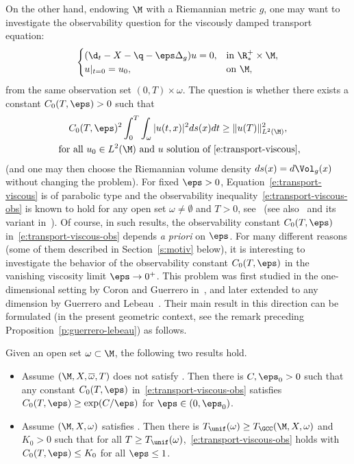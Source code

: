 On the other hand, endowing $\M$ with a Riemannian metric $g$, one may want to investigate the observability question for the viscously damped transport equation:
\begin{equation}
\label{e:transport-viscous}
\begin{cases}
(\d_t - X -\q - \eps \Delta_g ) u = 0, & \text{in } \R^+_*\times \M, \\
u|_{t=0} = u_0, & \text{on } \M,
\end{cases}
\end{equation}
from the same observation set $(0,T)\times\omega$. The question is whether there exists a constant $C_0(T,\eps)>0$ such that
\begin{multline}
\label{e:transport-viscous-obs}
C_0(T,\eps)^2 \int_0^T\int_\omega |u(t,x)|^2 ds(x)dt \geq \|u (T)\|_{L^2(\M)}^2, \\
\text{ for all } u_0 \in L^2(\M) \text{ and } u \text{ solution of~\eqref{e:transport-viscous}},
\end{multline}
(and one may then choose the Riemannian volume density $ds(x) = d\Vol_g(x)$ without changing the problem).
For fixed $\eps>0$, Equation~\eqref{e:transport-viscous} is of parabolic type and the observability inequality~\eqref{e:transport-viscous-obs} is known to hold for any open set $\omega \neq \emptyset$ and $T>0$, see~\cite{FI:96} (see also~\cite{LR:95} and its variant in~\cite{Lea:10}).
Of course, in such results, the observability constant $C_0(T,\eps)$ in~\eqref{e:transport-viscous-obs} depends {\em a priori} on $\eps$.
For many different reasons (some of them described in Section~\ref{s:motiv} below), it is interesting to investigate the behavior of the observability constant $C_0(T,\eps)$ in the vanishing viscosity limit $\eps \to 0^+$. This problem was first studied in the one-dimensional setting by Coron and Guerrero in~\cite{CG:05}, and later extended to any dimension by Guerrero and Lebeau~\cite{GL:07}. Their main result in this direction can be formulated (in the present geometric context, see the remark preceding Proposition~\ref{p:guerrero-lebeau}) as follows.
\begin{theorem}
\label{t:Leb-Guer}
Given an open set $\omega \subset \M$, the following two results hold.
\begin{itemize}
\item \cite[Th.\,1]{GL:07} Assume $(\M,X,\overline{\omega}, T)$ does not satisfy \pGCC. Then there is \hbox{$C, \eps_0>0$} such that any constant $C_0(T,\eps)$ in~\eqref{e:transport-viscous-obs} satisfies $C_0(T,\eps)\geq \exp(C/\eps)$ for $\eps \in (0,\eps_0)$.
\item \cite[Th.\,3]{GL:07} Assume $(\M,X,\omega)$ satisfies \pGCC. Then there is $T_{\unif}(\omega) \geq T_{\GCC}(\M,X,\omega)$ and $K_0>0$ such that for all $T\geq T_{\unif}(\omega)$,~\eqref{e:transport-viscous-obs} holds with $C_0(T,\eps)\leq K_0$ for all $\eps \leq 1$.
\end{itemize}
\end{theorem}
